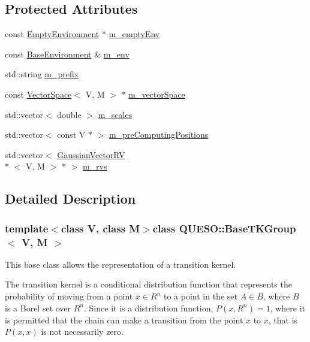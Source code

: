 \subsection*{Protected Attributes}
\begin{DoxyCompactItemize}
\item 
const \hyperlink{class_q_u_e_s_o_1_1_empty_environment}{Empty\-Environment} $\ast$ \hyperlink{class_q_u_e_s_o_1_1_base_t_k_group_a41a8a2d2fde3c1994d3a542ccf9a194e}{m\-\_\-empty\-Env}
\item 
const \hyperlink{class_q_u_e_s_o_1_1_base_environment}{Base\-Environment} \& \hyperlink{class_q_u_e_s_o_1_1_base_t_k_group_a2bce5e8aa5c844d4332a0e73cf00a1f9}{m\-\_\-env}
\item 
std\-::string \hyperlink{class_q_u_e_s_o_1_1_base_t_k_group_a7c77e4969de60624dba1049cf44a1ab6}{m\-\_\-prefix}
\item 
const \hyperlink{class_q_u_e_s_o_1_1_vector_space}{Vector\-Space}$<$ V, M $>$ $\ast$ \hyperlink{class_q_u_e_s_o_1_1_base_t_k_group_a9930bbda0f3d9368653fb0577b89ec33}{m\-\_\-vector\-Space}
\item 
std\-::vector$<$ double $>$ \hyperlink{class_q_u_e_s_o_1_1_base_t_k_group_ad36d4dc6f4812e3e10d8090f0dbb9e40}{m\-\_\-scales}
\item 
std\-::vector$<$ const V $\ast$ $>$ \hyperlink{class_q_u_e_s_o_1_1_base_t_k_group_a93d7fe55e30a7c6f209b01cb8a67e322}{m\-\_\-pre\-Computing\-Positions}
\item 
std\-::vector$<$ \hyperlink{class_q_u_e_s_o_1_1_gaussian_vector_r_v}{Gaussian\-Vector\-R\-V}\\*
$<$ V, M $>$ $\ast$ $>$ \hyperlink{class_q_u_e_s_o_1_1_base_t_k_group_a87c6b02ea45ab3de634c22afa58f53a5}{m\-\_\-rvs}
\end{DoxyCompactItemize}


\subsection{Detailed Description}
\subsubsection*{template$<$class V, class M$>$class Q\-U\-E\-S\-O\-::\-Base\-T\-K\-Group$<$ V, M $>$}

This base class allows the representation of a transition kernel. 

The transition kernel is a conditional distribution function that represents the probability of moving from a point $ x \in R^n $ to a point in the set $ A \in B $, where $ B $ is a Borel set over $ R^n $. Since it is a distribution function, $ P(x,R^n)=1 $, where it is permitted that the chain can make a transition from the point $ x $ to $ x $, that is $ P(x, {x}) $ is not necessarily zero. 

